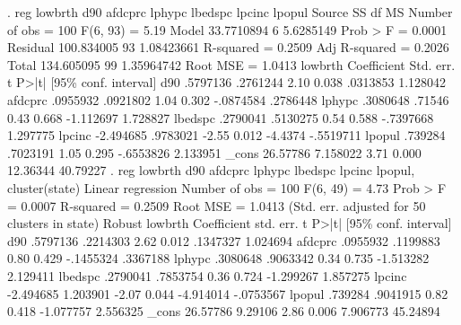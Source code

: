 . reg lowbrth d90 afdcprc lphypc lbedspc lpcinc lpopul
{\smallskip}
      Source {\VBAR}       SS           df       MS      Number of obs   =       100
   F(6, 93)        =      5.19
       Model {\VBAR}  33.7710894         6   5.6285149   Prob > F        =    0.0001
    Residual {\VBAR}  100.834005        93  1.08423661   R-squared       =    0.2509
   Adj R-squared   =    0.2026
       Total {\VBAR}  134.605095        99  1.35964742   Root MSE        =    1.0413
{\smallskip}
     lowbrth {\VBAR} Coefficient  Std. err.      t    P>|t|     [95\% conf. interval]
         d90 {\VBAR}   .5797136   .2761244     2.10   0.038     .0313853    1.128042
     afdcprc {\VBAR}   .0955932   .0921802     1.04   0.302    -.0874584    .2786448
      lphypc {\VBAR}   .3080648     .71546     0.43   0.668    -1.112697    1.728827
     lbedspc {\VBAR}   .2790041   .5130275     0.54   0.588    -.7397668    1.297775
      lpcinc {\VBAR}  -2.494685   .9783021    -2.55   0.012      -4.4374   -.5519711
      lpopul {\VBAR}    .739284   .7023191     1.05   0.295    -.6553826    2.133951
       _cons {\VBAR}   26.57786   7.158022     3.71   0.000     12.36344    40.79227
{\smallskip}
. reg lowbrth d90 afdcprc lphypc lbedspc lpcinc lpopul, cluster(state)
{\smallskip}
Linear regression                               Number of obs     =        100
                                                F(6, 49)          =       4.73
                                                Prob > F          =     0.0007
                                                R-squared         =     0.2509
                                                Root MSE          =     1.0413
{\smallskip}
                                 (Std. err. adjusted for 50 clusters in state)
             {\VBAR}               Robust
     lowbrth {\VBAR} Coefficient  std. err.      t    P>|t|     [95\% conf. interval]
         d90 {\VBAR}   .5797136   .2214303     2.62   0.012     .1347327    1.024694
     afdcprc {\VBAR}   .0955932   .1199883     0.80   0.429    -.1455324    .3367188
      lphypc {\VBAR}   .3080648   .9063342     0.34   0.735    -1.513282    2.129411
     lbedspc {\VBAR}   .2790041   .7853754     0.36   0.724    -1.299267    1.857275
      lpcinc {\VBAR}  -2.494685   1.203901    -2.07   0.044    -4.914014   -.0753567
      lpopul {\VBAR}    .739284   .9041915     0.82   0.418    -1.077757    2.556325
       _cons {\VBAR}   26.57786    9.29106     2.86   0.006     7.906773    45.24894
{\smallskip}
